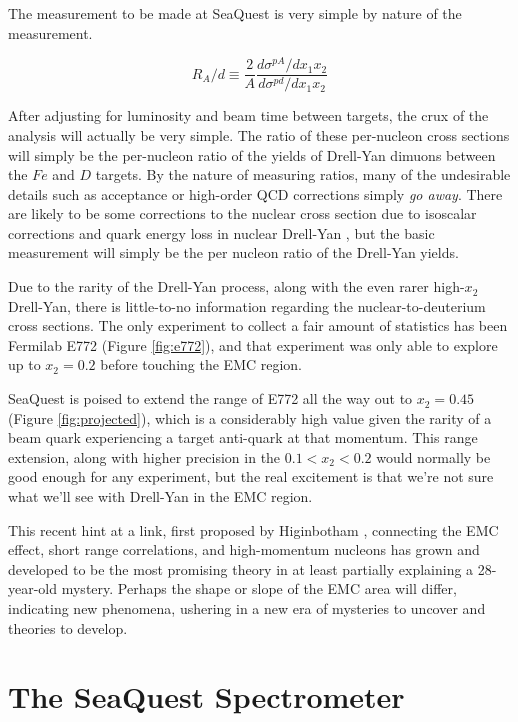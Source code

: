 \documentclass[11pt]{article}
\begin{document}
The measurement to be made at SeaQuest is very simple by nature of the measurement.

\begin{equation}
R_A/d \equiv \frac{2}{A} \frac{d\sigma^{pA}/dx_1x_2}{d\sigma^{pd}/dx_1x_2}
\end{equation}

After adjusting for luminosity and beam time between targets, the crux of the analysis will actually be very simple.  The ratio of these per-nucleon cross sections will simply be the per-nucleon ratio of the yields of Drell-Yan dimuons between the $Fe$ and $D$ targets. By the nature of measuring ratios, many of the undesirable details such as acceptance or high-order QCD corrections simply \emph{go away}.  There are likely to be some corrections to the nuclear cross section due to isoscalar corrections \cite{Seely:2009gt, Cloet:2009qs} and quark energy loss in nuclear Drell-Yan \cite{duan-2007-50}, but the basic measurement will simply be the per nucleon ratio of the Drell-Yan yields.

Due to the rarity of the Drell-Yan process, along with the even rarer high-$x_2$ Drell-Yan, there is little-to-no information regarding the nuclear-to-deuterium cross sections. The only experiment to collect a fair amount of statistics has been Fermilab E772 (Figure \ref{fig:e772}), and that experiment was only able to explore up to $x_2=0.2$ before touching the EMC region. 

SeaQuest is poised to extend the range of E772 all the way out to $x_2=0.45$ (Figure \ref{fig:projected}), which is a considerably high value given the rarity of a beam quark experiencing a target anti-quark at that momentum. This range extension, along with higher precision in the $0.1<x_2<0.2$ would normally be good enough for any experiment, but the real excitement is that we're not sure what we'll see with Drell-Yan in the EMC region.

This recent hint at a link, first proposed by Higinbotham \cite{Higinbotham:2010ye}, connecting the EMC effect, short range correlations, and high-momentum nucleons has grown and developed to be the most promising theory in at least partially explaining a 28-year-old mystery. Perhaps the shape or slope of the EMC area will differ, indicating new phenomena, ushering in a new era of mysteries to uncover and theories to develop.

\section{The SeaQuest Spectrometer}
\end{document}
